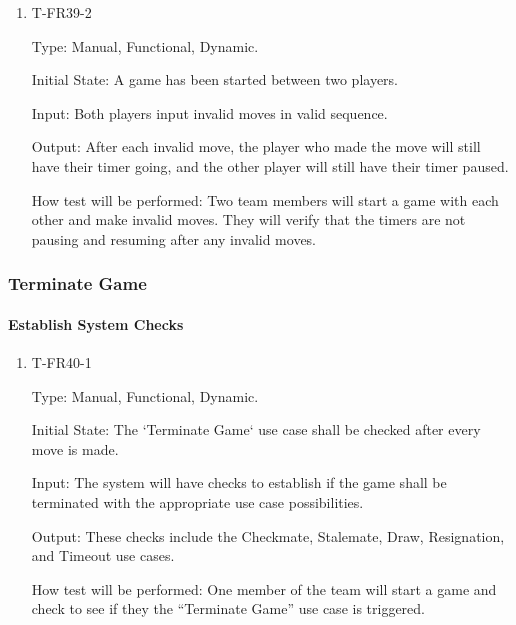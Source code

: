\documentclass[12pt, titlepage]{article}
\begin{document}
        \begin{enumerate}

        \item{T-FR39-2\\}

            Type: Manual, Functional, Dynamic.
            					
            Initial State: A game has been started between two players.
            					
            Input: Both players input invalid moves in valid sequence.
            					
            Output: After each invalid move, the player who made the move will still have their timer going, and the other player will still have their timer paused.

            How test will be performed: Two team members will start a game with each other and make invalid moves. They will verify that the timers are not pausing and resuming after any invalid moves.

        \end{enumerate}
        
\subsubsection{Terminate Game}

    \paragraph{Establish System Checks}

            \begin{enumerate}

            \item{T-FR40-1\\}

                Type: Manual, Functional, Dynamic.
                					
                Initial State: The ‘Terminate Game‘ use case shall be checked after every move is made.
                					
                Input: The system will have checks to establish if the game shall be terminated with the appropriate use case possibilities. 
                					
                Output: These checks include the Checkmate, Stalemate, Draw, Resignation, and Timeout use cases.

                How test will be performed: One member of the team will start a game and check to see if they the ``Terminate Game'' use case is triggered.

            \end{enumerate}
\end{document}
